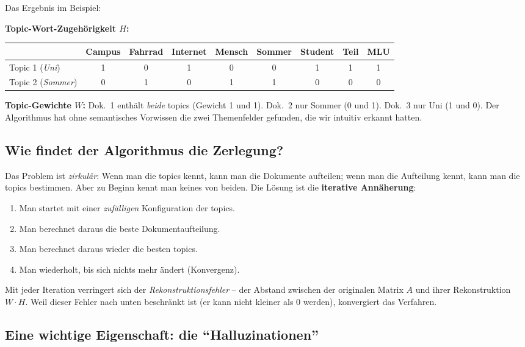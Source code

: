 \documentclass[a4paper,11pt]{article}
\begin{document}
Das Ergebnis im Beispiel:

\smallskip
\textbf{Topic-Wort-Zugehörigkeit $H$:}
\begin{center}
\footnotesize
\begin{tabular}{@{}l|cccccccc@{}}
\toprule
& Campus & Fahrrad & Internet & Mensch & Sommer & Student & Teil & MLU \\
\midrule
Topic 1 (\emph{Uni}) & 1 & 0 & 1 & 0 & 0 & 1 & 1 & 1 \\
Topic 2 (\emph{Sommer}) & 0 & 1 & 0 & 1 & 1 & 0 & 0 & 0 \\
\bottomrule
\end{tabular}
\end{center}

\smallskip
\textbf{Topic-Gewichte $W$:} Dok.\ 1 enthält \emph{beide} topics
(Gewicht 1 und 1). Dok.\ 2 nur Sommer (0 und 1). Dok.\ 3 nur Uni
(1 und 0). Der Algorithmus hat ohne semantisches Vorwissen die zwei
Themenfelder gefunden, die wir intuitiv erkannt hatten.

\subsection{Wie findet der Algorithmus die Zerlegung?}

Das Problem ist \emph{zirkulär}: Wenn man die topics kennt, kann man
die Dokumente aufteilen; wenn man die Aufteilung kennt, kann man die
topics bestimmen. Aber zu Beginn kennt man keines von beiden. Die
Lösung ist die \textbf{iterative Annäherung}:

\begin{enumerate}
\item Man startet mit einer \emph{zufälligen} Konfiguration der topics.
\item Man berechnet daraus die beste Dokumentaufteilung.
\item Man berechnet daraus wieder die besten topics.
\item Man wiederholt, bis sich nichts mehr ändert (Konvergenz).
\end{enumerate}

Mit jeder Iteration verringert sich der \emph{Rekonstruktionsfehler}
-- der Abstand zwischen der originalen Matrix $A$ und ihrer
Rekonstruktion $W \cdot H$. Weil dieser Fehler nach unten beschränkt
ist (er kann nicht kleiner als 0 werden), konvergiert das Verfahren.

\subsection{Eine wichtige Eigenschaft: die \enquote{Halluzinationen}}
\end{document}
